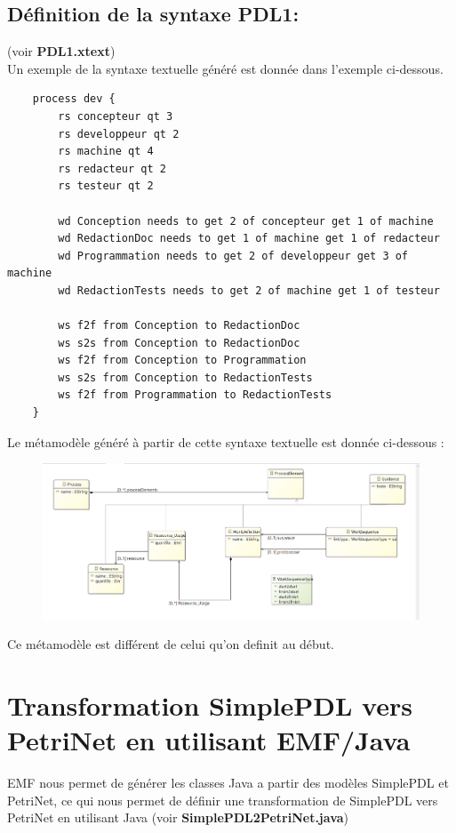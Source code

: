\documentclass{article}
\begin{document}
\subsection{Définition de la syntaxe PDL1:}
(voir \textbf{PDL1.xtext}) \\
Un exemple de la syntaxe textuelle généré est donnée dans l'exemple ci-dessous.
\begin{verbatim}
    process dev {
        rs concepteur qt 3
        rs developpeur qt 2
        rs machine qt 4
        rs redacteur qt 2
        rs testeur qt 2
        
        wd Conception needs to get 2 of concepteur get 1 of machine
        wd RedactionDoc needs to get 1 of machine get 1 of redacteur
        wd Programmation needs to get 2 of developpeur get 3 of machine
        wd RedactionTests needs to get 2 of machine get 1 of testeur
        
        ws f2f from Conception to RedactionDoc
        ws s2s from Conception to RedactionDoc
        ws f2f from Conception to Programmation
        ws s2s from Conception to RedactionTests
        ws f2f from Programmation to RedactionTests
    }
\end{verbatim}
Le métamodèle généré à partir de cette syntaxe textuelle est donnée ci-dessous : 
\begin{figure}[H]
    \centering
    \includegraphics[width = 18cm]{SimplePDLXtext.png}
\end{figure}
Ce métamodèle est différent de celui qu'on definit au début.
\section{Transformation SimplePDL vers PetriNet en utilisant EMF/Java}
EMF nous permet de générer les classes Java a partir des modèles SimplePDL et PetriNet, ce qui nous permet de définir une transformation
de SimplePDL vers PetriNet en utilisant Java (voir \textbf{SimplePDL2PetriNet.java})
\end{document}
